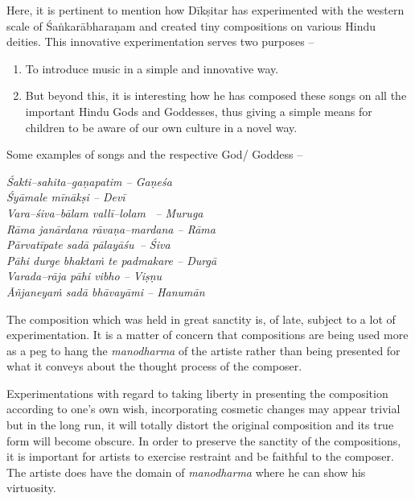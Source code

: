 Here, it is pertinent to mention how Dīkṣitar has experimented with the western scale of Śaṅkarābharaṇam and created tiny compositions on various Hindu deities. This innovative experimentation serves two purposes –

\vspace{-.3cm}

\begin{enumerate}
\itemsep=0pt
\item To introduce music in a simple and innovative way.

 \item But beyond this, it is interesting how he has composed these songs on all the important Hindu Gods and Goddesses, thus giving a simple means for children to be aware of our own culture in a novel way.

\end{enumerate}

\vspace{-.3cm}

Some examples of songs and the respective God/ Goddess –

\begin{myquote}
\textit{Śakti–sahita–gaṇapatim – Gaṇeśa} \\\textit{Śyāmale mīnākṣi – Devī}\\\textit{Vara–śiva–bālam vallī–lolam  – Muruga}\\\textit{Rāma janārdana rāvaṇa–mardana – Rāma} \\\textit{Pārvatīpate sadā pālayāśu – Śiva}\\\textit{Pāhi durge bhaktaṁ te padmakare – Durgā} \\\textit{Varada–rāja pāhi vibho – Viṣṇu}\\\textit{Āñjaneyaṁ sadā bhāvayāmi – Hanumān}
\end{myquote}

The composition which was held in great sanctity is, of late, subject to a lot of experimentation. It is a matter of concern that compositions are being used more as a peg to hang the \textit{manodharma} of the artiste rather than being presented for what it conveys about the thought process of the composer.

Experimentations with regard to taking liberty in presenting the composition according to one’s own wish, incorporating cosmetic changes may appear trivial but in the long run, it will totally distort the original composition and its true form will become obscure. In order to preserve the sanctity of the compositions, it is important for artists to exercise restraint and be faithful to the composer. The artiste does have the domain of \textit{manodharma} where he can show his virtuosity.

